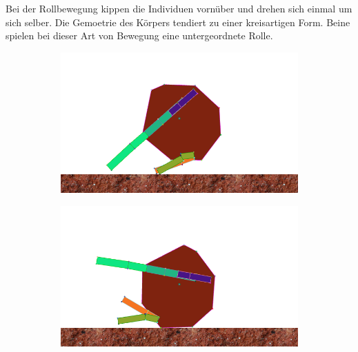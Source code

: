       Bei der Rollbewegung kippen die Individuen vornüber und drehen sich einmal um sich selber.
      Die Gemoetrie des Körpers tendiert zu einer kreisartigen Form.
      Beine spielen bei dieser Art von Bewegung eine untergeordnete Rolle.

      \begin{figure}[H]
        \centering

        \begin{subfigure}[b]{0.3\textwidth}
          \includegraphics[width=\linewidth,center]{graphics/simulation-discussion/roll_1}
          \caption{\label{fig:roll_1}}
        \end{subfigure}
        \hspace{\fill}
        \begin{subfigure}[b]{0.3\textwidth}
          \includegraphics[width=\linewidth,center]{graphics/simulation-discussion/roll_2}
          \caption{\label{fig:roll_2}}
        \end{subfigure}
        \hspace{\fill}
        \begin{subfigure}[b]{0.3\textwidth}

\end{subfigure}
\end{figure}
